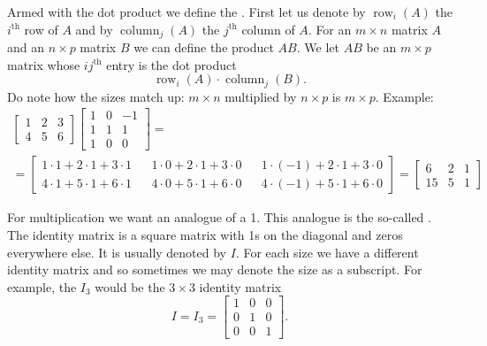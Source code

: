 Armed with the dot product we define the
\emph{}.
First let us denote by $\operatorname{row}_i(A)$ the $i^{\text{th}}$ row
of $A$ and by
$\operatorname{column}_j(A)$ the $j^{\text{th}}$ column of $A$.
For an $m \times n$ matrix $A$ and an $n \times p$ matrix $B$
we can define the product $AB$.  We let $AB$ be an $m \times p$
matrix whose $ij^{\text{th}}$ entry is the dot product
\begin{equation*}
\operatorname{row}_i(A) \cdot
\operatorname{column}_j(B) .
\end{equation*}
Do note how the sizes match up: $m \times n$ multiplied by $n \times p$ is 
$m \times p$.  Example:
\begin{multline*}
\begin{bmatrix}
1 & 2 & 3 \\
4 & 5 & 6
\end{bmatrix}
\begin{bmatrix}
1 & 0 & -1 \\
1 & 1 & 1 \\
1 & 0 & 0
\end{bmatrix}
= \\ =
\begin{bmatrix}
1\cdot 1 + 2\cdot 1 + 3 \cdot 1 &  &
1\cdot 0 + 2\cdot 1 + 3 \cdot 0 &  &
1\cdot (-1) + 2\cdot 1 + 3 \cdot 0 \\
4\cdot 1 + 5\cdot 1 + 6 \cdot 1 &  &
4\cdot 0 + 5\cdot 1 + 6 \cdot 0 &  &
4\cdot (-1) + 5\cdot 1 + 6 \cdot 0
\end{bmatrix}
=
\begin{bmatrix}
6 & 2 & 1 \\
15 & 5 & 1
\end{bmatrix}
\end{multline*}

\medskip

For multiplication we want an analogue of a 1.  This analogue is the
so-called \emph{}.
The identity matrix is a square matrix with 1s on the
diagonal and zeros everywhere else.  It is usually denoted by $I$.
For each size we have a different identity matrix and so sometimes we may denote
the size as a subscript.  For example, the $I_3$ would be the $3 \times 3$
identity matrix
\begin{equation*}
I = I_3 =
\begin{bmatrix}
1 & 0 & 0 \\
0 & 1 & 0 \\
0 & 0 & 1
\end{bmatrix} .
\end{equation*}

